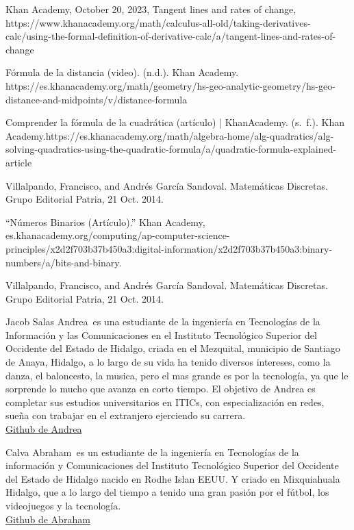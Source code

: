 \documentclass{IEEEcsmag}
\begin{document}
\begin{thebibliography}{1}

 Khan Academy, October 20, 2023, Tangent lines and rates of change,
  https://www.khanacademy.org/math/calculus-all-old/taking-derivatives-calc/using-the-formal-definition-of-derivative-calc/a/tangent-lines-and-rates-of-change

  Fórmula de la distancia (video). (n.d.). Khan Academy. https://es.khanacademy.org/math/geometry/hs-geo-analytic-geometry/hs-geo-distance-and-midpoints/v/distance-formula

Comprender la fórmula de la cuadrática (artículo) | KhanAcademy.
  (s. f.). Khan Academy.https://es.khanacademy.org/math/algebra-home/alg-quadratics/alg-solving-quadratics-using-the-quadratic-formula/a/quadratic-formula-explained-article

  Villalpando, Francisco, and Andrés García Sandoval. Matemáticas Discretas. Grupo Editorial Patria, 21 Oct. 2014.
  
   “Números Binarios (Artículo).” Khan Academy, es.khanacademy.org/computing/ap-computer-science-principles/x2d2f703b37b450a3:digital-information/x2d2f703b37b450a3:binary-numbers/a/bits-and-binary.

    Villalpando, Francisco, and Andrés García Sandoval. Matemáticas Discretas. Grupo Editorial Patria, 21 Oct. 2014.
\end{thebibliography}\vspace*{-8pt}

\begin{IEEEbiography}{Jacob Salas Andrea}{\,} es una estudiante de la ingeniería en Tecnologías de la Información y las Comunicaciones en el Instituto Tecnológico Superior del Occidente del Estado de Hidalgo, criada en el Mezquital, municipio de Santiago de Anaya, Hidalgo, a lo largo de su vida ha tenido diversos intereses, como la danza, el baloncesto, la musica,  pero el mas grande es por la tecnología, ya que le sorprende lo mucho que avanza en corto tiempo. El objetivo de Andrea es completar sus estudios universitarios en ITICs, con especialización en redes, sueña con trabajar en el extranjero ejerciendo su carrera. \\
\href{https://github.com/AndyJacobSalas}{Github de Andrea}
\end{IEEEbiography}

\begin{IEEEbiography}{Calva Abraham}{\,} es un estudiante de la ingeniería en Tecnologías de la información y Comunicaciones del Instituto Tecnológico Superior del Occidente del Estado de Hidalgo nacido en Rodhe Islan EEUU. Y criado en Mixquiahuala Hidalgo, que a lo largo del tiempo a tenido una gran pasión por el fútbol, los videojuegos y la tecnología.\\
\href{https://github.com/AbrahamCalva}{Github de Abraham}
\end{IEEEbiography}
\end{document}
